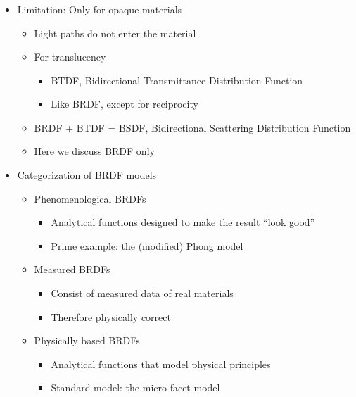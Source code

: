 \documentclass[utf8,stillsansserifmath,fleqn,t]{beamer}
\begin{document}
\begin{frame}[label=materials-2]
\frametitle{\insertsection}
\begin{itemize}
\item Limitation: Only for opaque materials
    \begin{itemize}
    \item Light paths do not enter the material
    \item For translucency
        \begin{itemize}
        \item BTDF, Bidirectional Transmittance Distribution
    Function
        \item Like BRDF, except for reciprocity
        \end{itemize}
    \item BRDF + BTDF = BSDF, Bidirectional Scattering Distribution
    Function
    \item Here we discuss BRDF only
    \end{itemize}
\item Categorization of BRDF models
    \begin{itemize}
    \item Phenomenological BRDFs\\
        \begin{itemize}
        \item Analytical functions designed to make the result ``look good''
        \item Prime example: the (modified) Phong model
        \end{itemize}
    \item Measured BRDFs
        \begin{itemize}
        \item Consist of measured data of real materials
        \item Therefore physically correct
        \end{itemize}
    \item Physically based BRDFs
        \begin{itemize}
        \item Analytical functions that model physical principles
        \item Standard model: the micro facet model
        \end{itemize}
    \end{itemize}
\end{itemize}
\end{frame}
\end{document}
